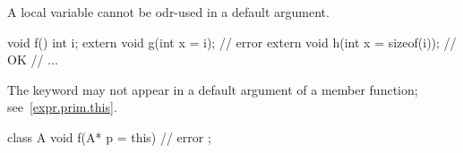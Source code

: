 \pnum
\begin{note}
A local variable cannot be odr-used
in a default argument.
\end{note}
\begin{example}
\begin{codeblock}
void f() {
  int i;
  extern void g(int x = i);         // error
  extern void h(int x = sizeof(i)); // OK
  // ...
}
\end{codeblock}
\end{example}

\pnum
\begin{note}
The keyword
may not appear in a default argument of a member function;
see~\ref{expr.prim.this}.
\begin{example}

\begin{codeblock}
class A {
  void f(A* p = this) { }           // error
};
\end{codeblock}
\end{example}
\end{note}

